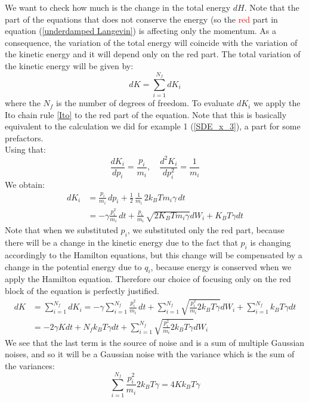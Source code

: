 We want to check how much is the change in the total energy $dH$. Note that the part of the equations that does not conserve the energy (so the \textcolor{red}{red} part in equation (\ref{underdamped Langevin}) is affecting only the momentum. As a consequence, the variation of the total energy will coincide with the variation of the kinetic energy  and it will depend only on the red part.
The total variation of the kinetic energy will be given by:
\begin{equation}
    dK = \sum_{i=1}^{N_f} dK_i
\end{equation}
where the $N_f$ is the number of degrees of freedom.
To evaluate $dK_i$ we apply the Ito chain rule \ref{Ito} to the red part of the equation. Note that this is basically equivalent to the calculation we did for example 1 (\ref{SDE_x_3}), a part for some prefactors. \\
Using that:
\begin{equation}
    \frac{dK_i}{dp_i} = \frac{p_i}{m_i}, \quad \frac{d^2K_i}{dp_i^2}= \frac{1}{m_i}
\end{equation}
We obtain:
\begin{align*}
    dK_i &=  \frac{p_i}{m_i}\,dp_i + \frac{1}{2}\,\frac{1}{m_i}\,2 k_B T m_i \gamma\,dt \\
    &= -\gamma \frac{p_i^2}{m_i}\,dt + \frac{p_i}{m_i}\, \sqrt{2K_B T m_i \gamma}dW_i + K_B T\gamma dt 
\end{align*}
Note that when we substituted $p_i$, we substituted only the red part, because there will be a change in the kinetic energy due to the fact that $p_i$ is changing accordingly to the Hamilton equations, but this change will be compensated by a change in the potential energy due to $q_i$, because energy is conserved when we apply the Hamilton equation. Therefore our choice of focusing only on the red block of the equation is perfectly justified.
\begin{align*}
    dK &= \sum_{i=1}^{N_f} dK_i = -\gamma \sum_{i=1}^{N_f} \frac{p_i^2}{m_i}\,dt + \sum_{i=1}^{N_f} \sqrt{ \frac{p_i^2}{m_i} 2k_B T \gamma }dW_i + \sum_{i=1}^{N_f} k_BT\gamma dt\\
    &=-2\gamma K dt + N_f k_B T \gamma dt + \sum_{i=1}^{N_f} \sqrt{ \frac{p_i^2}{m_i} 2k_B T \gamma }dW_i
\end{align*}
We see that the last term is the source of noise and is a sum of multiple Gaussian noises, and so it will be a Gaussian noise with the variance which is the sum of the variances:
\begin{equation}
    \sum_{i=1}^{N_f} \frac{p_i^2}{m_i} 2k_B T \gamma = 4Kk_B T\gamma
\end{equation}

